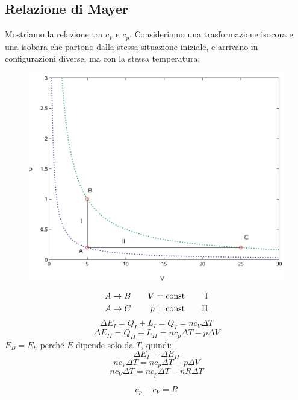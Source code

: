 \subsection{Relazione di Mayer}
\label{mayer}
Mostriamo la relazione tra $c_V$ e $c_p$. Consideriamo una trasformazione isocora e una isobara che partono dalla stessa situazione iniziale, e arrivano in configurazioni diverse, ma con la stessa temperatura:
\begin{figure}[htbp]
   \centering
   \includegraphics[scale=0.5]{immagini/fisica1/pV2_win}
\end{figure}
\begin{align*}
   A\rightarrow B & \quad & V=\text{const} & \quad & \text{I}  \\
   A\rightarrow C & \quad & p=\text{const} & \quad & \text{II}
\end{align*}
\[\Delta E_I=Q_I+L_I=Q_I=nc_V\Delta T\]
\[\Delta E_{II}=Q_{II}+L_{II}=nc_p\Delta T-p\Delta V\]
$E_B=E_h$ perché $E$ dipende solo da $T$, quindi:
\[\Delta E_I=\Delta E_{II}\]
\[nc_V\Delta T=nc_p\Delta T-p\Delta V\]
\[nc_V\Delta T=nc_p\Delta T-nR\Delta T\]
\begin{Teo}
   \begin{equation}
      c_p-c_V=R
   \end{equation}
\end{Teo}

